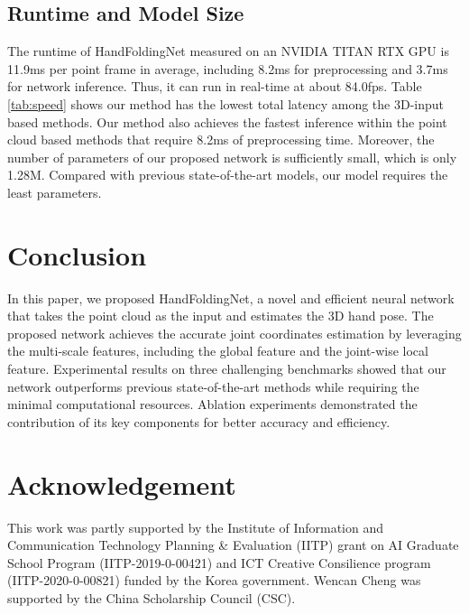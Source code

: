 \documentclass[10pt,twocolumn,letterpaper]{article}
\begin{document}
\subsection{Runtime and Model Size}

The runtime of HandFoldingNet measured on an NVIDIA TITAN RTX GPU is 11.9ms per point frame in average, including 8.2ms for preprocessing and 3.7ms for network inference. Thus, it can run in real-time at about 84.0fps.
Table \ref{tab:speed} shows our method has the lowest total latency among the 3D-input based methods. Our method also achieves the fastest inference within the point cloud based methods that require 8.2ms of preprocessing time. 
Moreover, the number of parameters of our proposed network is sufficiently small, which is only 1.28M. Compared with previous state-of-the-art models, our model requires the least parameters. 



\section{Conclusion}
In this paper, we proposed HandFoldingNet, a novel and efficient neural network that takes the point cloud as the input and estimates the 3D hand pose. The proposed network achieves the accurate joint coordinates estimation by leveraging the multi-scale features, including the global feature and the joint-wise local feature. Experimental results on three challenging benchmarks showed that our network outperforms previous state-of-the-art methods while requiring the minimal computational resources. Ablation experiments demonstrated the contribution of its key components for better accuracy and efficiency.



\section*{Acknowledgement}
\noindent
This work was partly supported by the Institute of Information and Communication Technology Planning \& Evaluation (IITP) grant on AI Graduate School Program (IITP-2019-0-00421) and ICT Creative Consilience program (IITP-2020-0-00821) funded by the Korea government. Wencan Cheng was supported by the China Scholarship Council (CSC).
\end{document}
